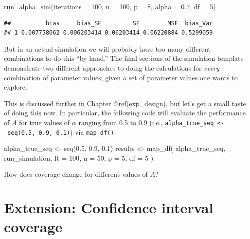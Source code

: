 \documentclass[
]{book}
\newenvironment{Shaded}{\begin{snugshade}}{\end{snugshade}}
\newcommand{\AttributeTok}[1]{\textcolor[rgb]{0.77,0.63,0.00}{#1}}
\newcommand{\DecValTok}[1]{\textcolor[rgb]{0.00,0.00,0.81}{#1}}
\newcommand{\FloatTok}[1]{\textcolor[rgb]{0.00,0.00,0.81}{#1}}
\newcommand{\FunctionTok}[1]{\textcolor[rgb]{0.00,0.00,0.00}{#1}}
\newcommand{\NormalTok}[1]{#1}
\newcommand{\OtherTok}[1]{\textcolor[rgb]{0.56,0.35,0.01}{#1}}
\begin{document}
\begin{Shaded}
\begin{Highlighting}[]
\FunctionTok{run\_alpha\_sim}\NormalTok{(}\AttributeTok{iterations =} \DecValTok{100}\NormalTok{, }\AttributeTok{n =} \DecValTok{100}\NormalTok{, }\AttributeTok{p =} \DecValTok{8}\NormalTok{, }\AttributeTok{alpha =} \FloatTok{0.7}\NormalTok{, }\AttributeTok{df =} \DecValTok{5}\NormalTok{)}
\end{Highlighting}
\end{Shaded}

\begin{verbatim}
##          bias     bias_SE         SE        MSE  bias_Var
## 1 0.007758062 0.006203414 0.06203414 0.06220884 0.5299059
\end{verbatim}

But in an actual simulation we will probably have too many different combinations to do this ``by hand.''
The final sections of the simulation template demonstrate two different approaches to doing the calculations for \emph{every} combination of parameter values, given a set of parameter values one wants to explore.

This is discussed further in Chapter @ref(exp\_design), but let's get a small taste of doing this now.
In particular, the following code will evaluate the performance of \(A\) for true values of \(\alpha\) ranging from 0.5 to 0.9 (i.e., \texttt{alpha\_true\_seq\ \textless{}-\ seq(0.5,\ 0.9,\ 0.1)}) via \texttt{map\_df()}:

\begin{Shaded}
\begin{Highlighting}[]
\NormalTok{alpha\_true\_seq }\OtherTok{\textless{}{-}} \FunctionTok{seq}\NormalTok{(}\FloatTok{0.5}\NormalTok{, }\FloatTok{0.9}\NormalTok{, }\FloatTok{0.1}\NormalTok{)}
\NormalTok{results }\OtherTok{\textless{}{-}} \FunctionTok{map\_df}\NormalTok{( alpha\_true\_seq, }
\NormalTok{                   run\_simulation,}
                   \AttributeTok{R =} \DecValTok{100}\NormalTok{,}
                   \AttributeTok{n =} \DecValTok{50}\NormalTok{, }\AttributeTok{p =} \DecValTok{5}\NormalTok{, }\AttributeTok{df =} \DecValTok{5}\NormalTok{ )}
\end{Highlighting}
\end{Shaded}

How does coverage change for different values of \(A\)?

\hypertarget{extension-confidence-interval-coverage}{%
\section{Extension: Confidence interval coverage}\label{extension-confidence-interval-coverage}}
\end{document}
